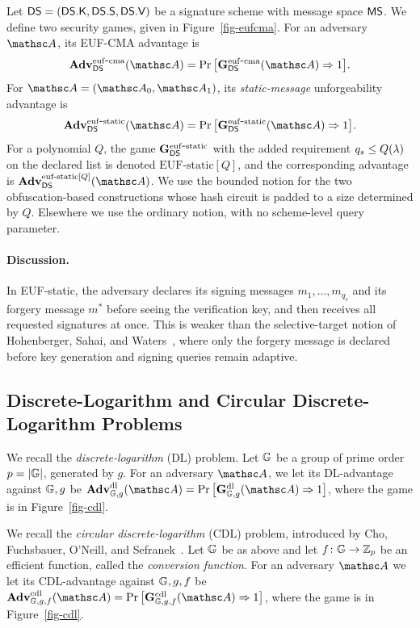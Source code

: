 \begin{samepage}
 Let $\mathsf{DS} = (\mathsf{DS}.\mathsf{K}, \mathsf{DS}.\mathsf{S},\mathsf{DS}.\mathsf{V})$ be a signature scheme with message space $\mathsf{MS}$. We define two security games, given in Figure~\ref{fig-eufcma}. For an adversary $\advA$, its EUF-CMA advantage is
$$
\AdvEUFCMA{\SigScheme}{\advA}
=\Pr\big[\gameEUFCMA{\SigScheme}(\advA)\Rightarrow1\big].
$$
For $\advA=(\advA_0,\advA_1)$, its \emph{static-message} unforgeability advantage is
$$
\AdvEUFSTATIC{\SigScheme}{\advA}
=\Pr\big[\gameEUFSTATIC{\SigScheme}(\advA)\Rightarrow1\big].
$$
For a polynomial $Q$, the game $\mathbf{G}^{\mathrm{euf\mbox{-}static}}_{\mathsf{DS}}$ with the added requirement $q_s \le Q(\lambda)$ on the declared list is denoted $\mathrm{EUF\text{-}static}[Q]$, and the corresponding advantage is $\AdvEUFSTATICQ{\SigScheme}{\advA}$. We use the bounded notion for the two obfuscation-based constructions whose hash circuit is padded to a size determined by $Q$. Elsewhere we use the ordinary notion, with no scheme-level query parameter.
\end{samepage}

\paragraph*{Discussion.} In EUF-static, the adversary declares its signing messages $m_1,\ldots,m_{q_s}$ and its forgery message $m^*$ before seeing the verification key, and then receives all requested signatures at once. This is weaker than the selective-target notion of Hohenberger, Sahai, and Waters~\cite{EC:HohSahWat14}, where only the forgery message is declared before key generation and signing queries remain adaptive.

\subsection{Discrete-Logarithm and Circular Discrete-Logarithm Problems} \label{sec-dl-cdl}

We recall the \emph{discrete-logarithm} (DL) problem.
Let $\mathbb{G}$ be a group of prime order $p = |\mathbb{G}|$, generated by $g$. For an adversary $\advA$, we let its DL-advantage against $\mathbb{G},g$ be $\AdvDL{\GG,g}{\advA} = \Pr\big[\gameDL{\GG,g}(\advA) \Rightarrow 1\big]$, where the game is in Figure~\ref{fig-cdl}.

We recall the \emph{circular discrete-logarithm} (CDL) problem, introduced by Cho, Fuchsbauer, O'Neill, and Sefranek~\cite{C:CFOS25}.
Let $\mathbb{G}$ be as above and let $f \colon \mathbb{G} \to \mathbb Z_p$ be an efficient function, called the \emph{conversion function}. For an adversary $\advA$ we let its CDL-advantage against $\mathbb{G},g,f$ be $\AdvCDL{\GG,g,f}{\advA} = \Pr\big[\gameCDL{\GG,g,f}(\advA) \Rightarrow 1\big]$, where the game is in Figure~\ref{fig-cdl}.


